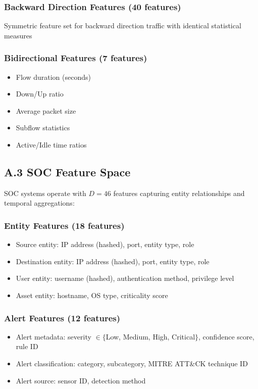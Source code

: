 \documentclass[12pt]{article}
\begin{document}
\subsubsection{Backward Direction Features (40 features)}
Symmetric feature set for backward direction traffic with identical statistical measures

\subsubsection{Bidirectional Features (7 features)}
\begin{itemize}
\item Flow duration (seconds)
\item Down/Up ratio
\item Average packet size
\item Subflow statistics
\item Active/Idle time ratios
\end{itemize}

\subsection{A.3 SOC Feature Space}

SOC systems operate with $D=46$ features capturing entity relationships and temporal aggregations:

\subsubsection{Entity Features (18 features)}
\begin{itemize}
\item Source entity: IP address (hashed), port, entity type, role
\item Destination entity: IP address (hashed), port, entity type, role
\item User entity: username (hashed), authentication method, privilege level
\item Asset entity: hostname, OS type, criticality score
\end{itemize}

\subsubsection{Alert Features (12 features)}
\begin{itemize}
\item Alert metadata: severity $\in \{$Low, Medium, High, Critical$\}$, confidence score, rule ID
\item Alert classification: category, subcategory, MITRE ATT\&CK technique ID
\item Alert source: sensor ID, detection method
\end{itemize}
\end{document}
